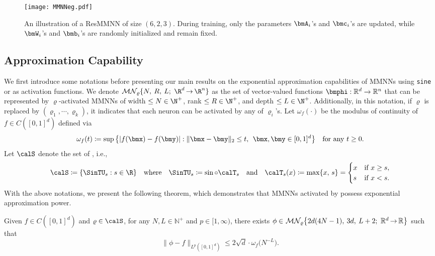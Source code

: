 \documentclass[11pt,a4paper]{article}
\let\dots\cdots
\begin{document}
\begin{figure}[ht]%
	\centering
	\texttt{[image: MMNNeg.pdf]}
\caption{An illustration of a ResMMNN of size $(6,2,3)$. During training, only the parameters $\bmA_i$'s and $\bmc_i$'s are updated, while $\bmW_i$'s and $\bmb_i$'s are randomly initialized and remain fixed.}
	\label{fig:MMNN:eg}
\end{figure}

\subsection{Approximation Capability}
\label{sec:approx:power}

We first introduce some notations before presenting our main results on the exponential approximation capabilities of MMNNs using \texttt{sine} or  as activation functions.
We denote $\mn{\varrho}{N}{R}{L}{\R^d}{\R^n}$ as the set of vector-valued functions $\bmphi:\mathbb{R}^d\to\mathbb{R}^n$ that can be represented
by $\varrho$-activated 
MMNNs
of width $\le N\in \N^+$, rank $\le R\in\N^+$, and depth $\le L\in\N^+$. 
Additionally, in this notation, if $\varrho$ is replaced by $(\varrho_1,\dots,\varrho_k)$, it indicates that each neuron can be activated by any of $\varrho_i$'s.
Let
$\omega_f(\cdot)$ be the modulus of continuity of $f\in C([0,1]^d)$ defined via
\begin{equation*}
    \omega_f(t)\coloneqq \sup \big\{|f(\bmx)-f(\bmy)|: \|\bmx-\bmy\|_2\le t,\,\;\bmx,\bmy\in [0,1]^d\big\}\quad \tn{for any $t\ge 0$.}
\end{equation*}
 Let $\calS$ denote  the set of , i.e., 
\begin{equation*}
    \calS\coloneqq \{\SinTU_s:s\in\R\}\quad \tn{where}\quad \SinTU_s\coloneqq \sin\circ \calT_s\quad \tn{and}\quad \calT_s(x) \coloneqq \max\{x,\, s\}=
\begin{cases} 
x & \text{if } x \ge s, \\ 
s & \text{if } x < s.
\end{cases}
\end{equation*}
With the above notations, we present the following theorem, which demonstrates that MMNNs activated by  possess exponential approximation power.

\begin{theorem}
\label{thm:main1}
Given $f \in C([0,1]^d)$ and $\varrho\in\calS$, for any $N,L \in \mathbb{N}^+$ and $p \in [1,\infty)$, there exists  
$\phi\in \mn[\big]{\varrho}{2d(4N-1)}{3d}{L+2}{\mathbb{R}^d}{\mathbb{R}}$
such that
\[
\| \phi - f\|_{L^p([0,1]^d)} \leq  2\sqrt{d}\cdot\omega_f\big(N^{-L}\big).
\]
\end{theorem}
\end{document}
